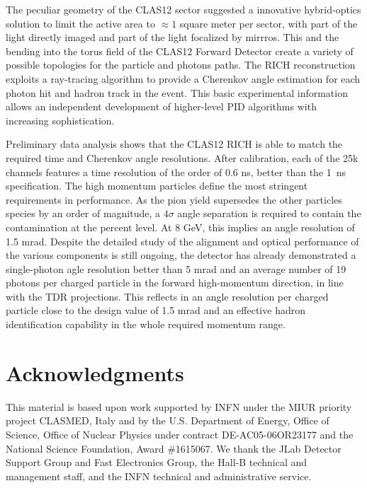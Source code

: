\documentclass[5p,times,twocolumn]{elsarticle}
\begin{document}
The peculiar geometry of the CLAS12 sector suggested a innovative 
hybrid-optics solution to limit the active area to $\approx 1$ square meter per sector, with part of the light directly
imaged and part of the light focalized by mirrros. This and the bending into
the torus field of the CLAS12 Forward Detector create a variety of
possible topologies for the particle and photons paths. 
The RICH reconstruction exploits a ray-tracing algorithm to provide a
Cherenkov angle estimation for each photon hit and hadron track in 
the event. This basic experimental information allows an independent 
development of higher-level PID algorithms with increasing sophistication.

Preliminary data analysis shows that the CLAS12 RICH is able to match the 
required time and Cherenkov angle resolutions. After calibration, each
of the 25k channels features a time resolution of the order of 0.6 ns,
better than the 1~ns specification. The high momentum particles
define the most stringent requirements in performance. As the pion yield
supersedes the other particles species by an order of magnitude, a 
$4\sigma$ angle separation is required to contain the contamination 
at the percent level. At 8 GeV, this implies an angle resolution of 1.5 mrad.
Despite the detailed study of the alignment and optical performance of the various 
components is still ongoing, the detector has already demonstrated a single-photon 
agle resolution better than 5 mrad and an average number of 19 photons per charged particle
in the forward high-momentum direction, in line with the TDR projections. This reflects in an angle resolution 
per charged particle close to the design value of 1.5 mrad and an effective hadron identification 
capability in the whole required momentum range.

\section{Acknowledgments}

This material is based upon work supported by INFN under the MIUR priority project CLASMED, Italy and by the
U.S. Department of Energy, Office of Science, Office of Nuclear Physics under contract DE-AC05-06OR23177 and
the National Science Foundation, Award \#1615067. We thank the JLab Detector Support Group and Fast Electronics
Group, the Hall-B technical and management staff, and the INFN technical and administrative service.
\end{document}
